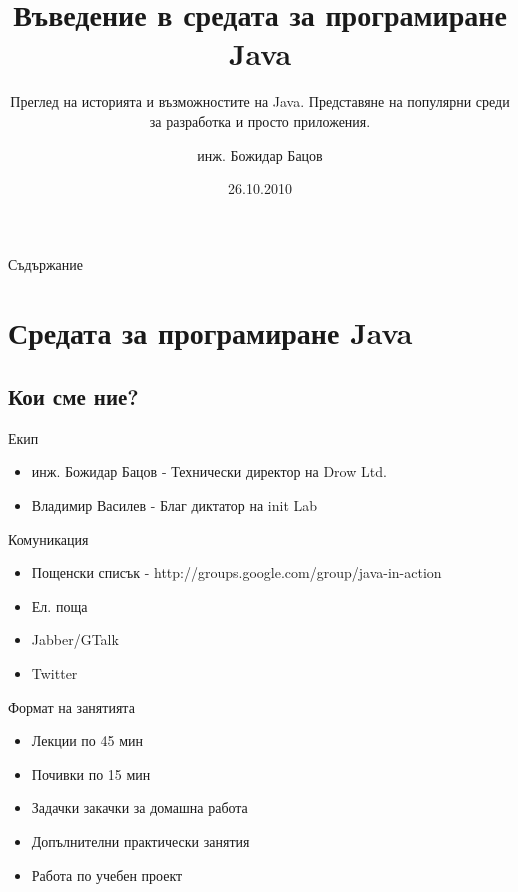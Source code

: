 \documentclass{beamer}
\title{Въведение в средата за програмиране Java}
\subtitle{Преглед на историята и възможностите на Java. Представяне на
  популярни среди за разработка и просто приложения.}
\author{инж. Божидар Бацов}
\institute{Drow Ltd.}
\date{26.10.2010}
\begin{document}
\begin{frame}
  \titlepage
\end{frame}

\begin{frame}{Съдържание}
  \tableofcontents
\end{frame}




\section{Средата за програмиране Java}

\subsection[Кои сме ние?]{Кои сме ние?}

\begin{frame}{Екип}
  \transdissolve
  \begin{itemize}
  \item
    инж. Божидар Бацов - Технически директор на Drow Ltd.
  \item
    Владимир Василев - Благ диктатор на init Lab
  \end{itemize}
\end{frame}

\begin{frame}{Комуникация}
  \transdissolve
  \begin{itemize}
  \item Пощенски списък - http://groups.google.com/group/java-in-action
  \item Ел. поща
  \item Jabber/GTalk
  \item Twitter
  \end{itemize}
\end{frame}

\begin{frame}{Формат на занятията}
  \transdissolve
  \begin{itemize}
  \item Лекции по 45 мин
  \item Почивки по 15 мин
  \item Задачки закачки за домашна работа
  \item Допълнителни практически занятия
  \item Работа по учебен проект
  \end{itemize}
\end{frame}
\end{document}

